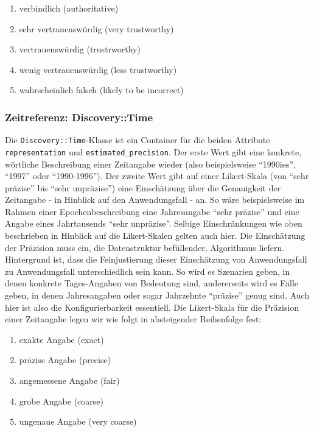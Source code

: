 \begin{enumerate}
  \item verbindlich (authoritative)
  \item sehr vertrauenswürdig (very trustworthy)
  \item vertrauenswürdig (trustrworthy)
  \item wenig vertrauenswürdig (less trustworthy)
  \item wahrscheinlich falsch (likely to be incorrect)
\end{enumerate}

\subsubsection{Zeitreferenz: Discovery::Time}
Die \texttt{Discovery::Time}-Klasse ist ein Container für die beiden Attribute \texttt{representation} und \texttt{estimated\_precision}. Der erste Wert gibt eine konkrete, wörtliche Beschreibung einer Zeitangabe wieder (also beispielsweise ``1990ies'', ``1997'' oder ``1990-1996''). Der zweite Wert gibt auf einer Likert-Skala (von ``sehr präzise'' bis ``sehr unpräzise'') eine Einschätzung über die Genauigkeit der Zeitangabe - in Hinblick auf den Anwendungsfall - an. So wäre beispielsweise im Rahmen einer Epochenbeschreibung eine Jahresangabe ``sehr präzise'' und eine Angabe eines Jahrtausends ``sehr unpräzise''. Selbige Einschränkungen wie oben beschrieben in Hinblick auf die Likert-Skalen gelten auch hier. Die Einschätzung der Präzision muss ein, die Datenstruktur befüllender, Algorithmus liefern. Hintergrund ist, dass die Feinjustierung dieser Einschätzung von Anwendungsfall zu Anwendungsfall unterschiedlich sein kann. So wird es Szenarien geben, in denen konkrete Tages-Angaben von Bedeutung sind, andererseits wird es Fälle geben, in denen Jahresangaben oder sogar Jahrzehnte ``präzise'' genug sind. Auch hier ist also die Konfigurierbarkeit essentiell. Die Likert-Skala für die Präzision einer Zeitangabe legen wir wie folgt in absteigender Reihenfolge fest:

\begin{enumerate}
  \item exakte Angabe (exact)
  \item präzise Angabe (precise)
  \item angemessene Angabe (fair)
  \item grobe Angabe (coarse)
  \item ungenaue Angabe (very coarse)
\end{enumerate}

